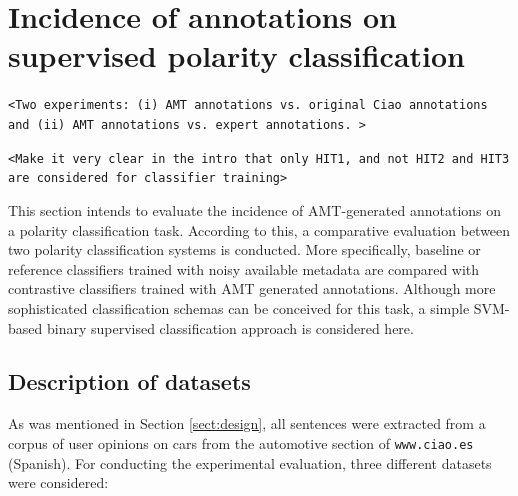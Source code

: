 \documentclass[11pt,letterpaper]{article}
\begin{document}
\section{Incidence of annotations on supervised polarity classification}
\label{sect:classifier}

\texttt{<Two experiments: (i) AMT annotations vs. original Ciao annotations and (ii) AMT annotations vs. expert annotations. >}

\texttt{<Make it very clear in the intro that only HIT1, and not HIT2 and HIT3 are considered for classifier training>}

This section intends to evaluate the incidence of AMT-generated annotations on a polarity classification task.
According to this, a comparative evaluation between two polarity classification systems is conducted. 
More specifically, baseline or reference classifiers trained with noisy available metadata are compared with 
contrastive classifiers trained with AMT generated annotations.  
Although more sophisticated classification schemas can be conceived for this task, a simple SVM-based binary supervised classification approach is considered here.

\subsection{Description of datasets}
\label{datasets}

As was mentioned in Section \ref{sect:design}, all sentences were extracted from a corpus of user opinions on cars from the automotive section of \texttt{www.ciao.es} (Spanish). For conducting the experimental evaluation, three different datasets were considered:
\end{document}
